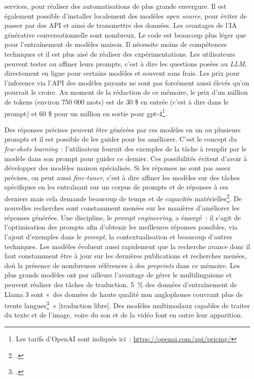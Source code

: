 	services, pour réaliser des automatisations de plus grande envergure. Il
	est également possible d'installer localement des modèles \emph{open
		source}, pour éviter de passer par des API et ainsi de transmettre des
	données. Les avantages de l'IA générative conversationnelle sont
	nombreux. Le code est beaucoup plus léger que pour l'entraînement de
	modèles maison. Il nécessite moins de compétences techniques et il est
	plus aisé de réaliser des expérimentations. Les utilisateurs peuvent
	tester ou affiner leurs \gls{prompt}s, c'est à dire les questions posées au
	\textit{LLM}, directement en ligne pour certains modèles et souvent sans
	frais. Les prix pour l'\gls{inference} via l'API des modèles payants ne sont
	pas forcément aussi élevés qu'on pourrait le croire. Au moment de la rédaction de ce mémoire,
	le prix d'un
	million de \gls{token}s (environ 750 000 mots) est de 30 \$ en entrée (c'est à
	dire dans le prompt) et 60 \$ pour un million en sortie pour
	gpt-4\footnote{Les tarifs d'OpenAI sont indiqués ici~: \url{https://openai.com/api/pricing/}}.
	
	Des réponses précises peuvent être générées par ces modèles en un ou
	plusieurs prompts et il est possible de les guider pour les améliorer. 
	C'est le concept du \emph{few-shots learning~}:
	l'utilisateur fournit des exemples de la tâche à remplir par le modèle
	dans son prompt pour guider ce dernier. Ces possibilités évitent d'avoir
	à développer des modèles maison spécialisés. Si les réponses ne sont pas
	assez précises, on peut aussi \emph{fine-tuner}, c'est à dire affiner
	les modèles sur des tâches spécifiques en les entraînant sur un corpus
	de prompts et de réponses à ces derniers mais cela demande beaucoup de
	temps et de capacités matérielles\footcite{wei_finetuned_2022}.
	De nouvelles recherches sont constamment menées sur les manières
	d'améliorer les réponses générées. Une discipline, le \emph{prompt
		engineering}, a émergé~: il s'agit de l'optimisation des prompts afin
	d'obtenir les meilleures réponses possibles, via l'ajout d'exemples dans
	le \textit{prompt}, la contextualisation et beaucoup d'autres techniques. Les
	modèles évoluent aussi rapidement que la recherche avance donc il faut
	constamment être à jour sur les dernières publications et recherches
	menées, d\textquotesingle où la présence de nombreuses références à des
	\emph{preprints} dans ce mémoire. Les plus grands modèles ont par ailleurs 
	l'avantage de gérer le multilinguisme et peuvent réaliser des tâches de
	traduction. 5~\% des données d'entraînement de Llama 3 sont «~des
	données de haute qualité non anglophones couvrant plus de trente
	langues\footcite{meta}~» {[}traduction libre{]}. Des modèles
	multimodaux capables de traiter du texte et de l'image, voire du son et
	de la vidéo font en outre leur apparition.\newline
	
